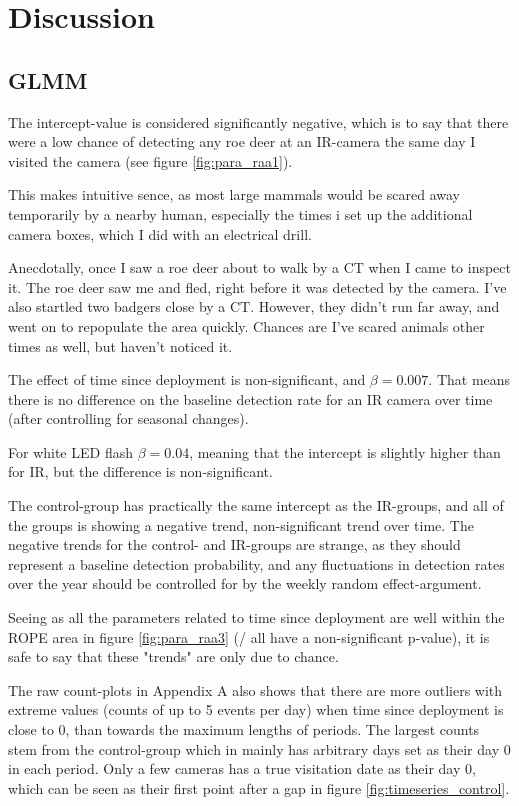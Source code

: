 \chapter{Discussion}

\section{GLMM}

The intercept-value is considered significantly negative, which is to say that there were a low chance of detecting any roe deer at an IR-camera the same day I visited the camera (see figure \ref{fig:para_raa1}). 

This makes intuitive sence, as most large mammals would be scared away temporarily by a nearby human, especially the times i set up the additional camera boxes, which I did with an electrical drill.

Anecdotally, once I saw a roe deer about to walk by a CT when I came to inspect it. The roe deer saw me and fled, right before it was detected by the camera. I've also startled two badgers close by a CT. However, they didn't run far away, and went on to repopulate the area quickly.
Chances are I’ve scared animals other times as well, but haven’t noticed it.

The effect of time since deployment is non-significant, and $\beta = 0.007$.
That means there is no difference on the baseline detection rate for an IR camera over time (after controlling for seasonal changes).

For white LED flash $\beta = 0.04$, meaning that the intercept is slightly higher than for IR, but the difference is non-significant.

The control-group has practically the same intercept as the IR-groups, and all of the groups is showing a negative trend, non-significant trend over time. The negative trends for the control- and IR-groups are strange, as they should represent a baseline detection probability, and any fluctuations in detection rates over the year should be controlled for by the weekly random effect-argument.

Seeing as all the parameters related to time since deployment are well within the ROPE area in figure \vref{fig:para_raa3} (/ all have a non-significant p-value), it is safe to say that these "trends" are only due to chance. 

The raw count-plots in Appendix A also shows that there are more outliers with extreme values (counts of up to 5 events per day) when time since deployment is close to 0, than towards the maximum lengths of periods. The largest counts stem from the control-group which in mainly has arbitrary days set as their day 0 in each period. Only a few cameras has a true visitation date as their day 0, which can be seen as their first point after a gap in figure \ref{fig:timeseries_control}.


